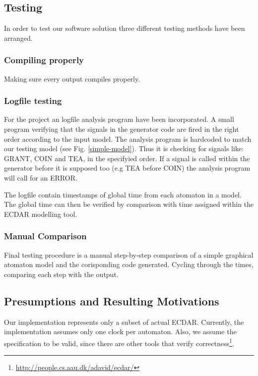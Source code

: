 \subsection{Testing}
\label{Testing}
In order to test our software solution three different testing methods have been
arranged.

\subsubsection{Compiling properly}
Making sure every output compiles properly.

\subsubsection{Logfile testing}
For the project an logfile analysis program have been incorporated. A small
program verifying that the signals in the generator code are fired in the right
order according to the input model.  The analysis program is hardcoded to match
our testing model (see Fig. \ref{simple-model}). Thus it is checking for signals
like: GRANT, COIN and TEA, in the specifyied order. If a signal is called within
the generator before it is supposed too (e.g TEA before COIN) the analysis
program will call for an ERROR.

The logfile contain timestamps of global time from each atomaton in a model. The
global time can then be verified by comparison with time assigned within the
ECDAR modelling tool.

\subsubsection{Manual Comparison}
Final testing procedure is a manual step-by-step comparison of a simple
graphical atomaton model and the corisponding code generated. Cycling through
the times, comparing each step with the output.

\subsection{Presumptions and Resulting Motivations}
\label{implementation-presumptions}

Our implementation represents only a subset of actual ECDAR. Currently, the
implementation assumes only one clock per automaton. Also, we assume the
specification to be valid, since there are other tools that verify
correctness\footnote{\url{http://people.cs.aau.dk/adavid/ecdar/}}.

